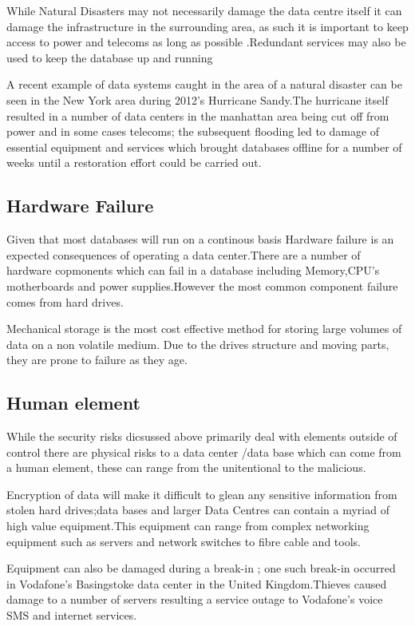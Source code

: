 \documentclass[11pt, twocolumn]{article}
\begin{document}
While Natural Disasters may not necessarily damage the data centre itself it can damage the infrastructure in the surrounding area, as such it is important to keep access to power and telecoms as long as possible .Redundant services may also be used to keep the database up and running  

A recent example of data systems caught in the area of a natural disaster can be seen in the New York area during 2012's Hurricane Sandy.The hurricane itself resulted in a number of data centers in the manhattan area being cut off from power and in some cases telecoms; the subsequent flooding led to damage of essential equipment and services which brought databases offline for a number of weeks until a restoration effort could be carried out.\cite{sean4}


\subsection{Hardware Failure}

Given that most databases will run on a continous basis Hardware failure is an expected consequences of operating a data center.There are a number of hardware copmonents which can fail in a database including Memory,CPU's motherboards and power supplies\cite{sean9}.However the most common component failure comes from hard drives.

Mechanical storage is the most cost effective method for storing large volumes of data on a non volatile medium\cite{sean2}. Due to the drives structure and moving parts, they are prone to failure as they age.

 


\subsection{Human element}

While the security risks dicsussed above primarily deal with elements outside of control there are physical risks to a data center /data base which can come from a human element, these can range from the unitentional to the malicious.

Encryption of data will make it  difficult to glean any sensitive information from stolen hard drives;data bases and larger Data Centres can contain a myriad of high value equipment.This equipment can range from complex networking equipment such as servers and network switches to fibre cable and tools.

Equipment can also be damaged during a break-in ; one such break-in occurred in Vodafone’s Basingstoke data center in the United Kingdom\cite{sean8}.Thieves caused damage to a number of servers resulting a service outage to Vodafone's voice SMS and internet services.
\end{document}
